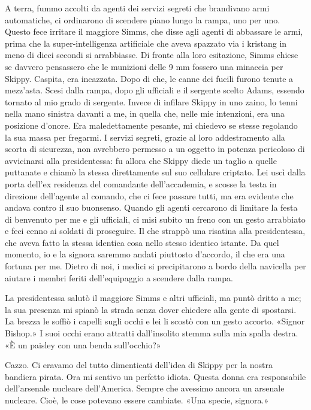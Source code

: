 A terra, fummo accolti da agenti dei servizi segreti che brandivano armi
automatiche, ci ordinarono di scendere piano lungo la rampa, uno per
uno. Questo fece irritare il maggiore Simms, che disse agli agenti di
abbassare le armi, prima che la super-intelligenza artificiale che aveva
spazzato via i kristang in meno di dieci secondi si arrabbiasse. Di
fronte alla loro esitazione, Simms chiese se davvero pensassero che le
munizioni delle 9 mm fossero una minaccia per Skippy. Caspita, era
incazzata. Dopo di che, le canne dei fucili furono tenute a mezz'asta.
Scesi dalla rampa, dopo gli ufficiali e il sergente scelto Adams,
essendo tornato al mio grado di sergente. Invece di infilare Skippy in
uno zaino, lo tenni nella mano sinistra davanti a me, in quella che,
nelle mie intenzioni, era una posizione d'onore. Era maledettamente
pesante, mi chiedevo se stesse regolando la sua massa per fregarmi. I
servizi segreti, grazie al loro addestramento alla scorta di sicurezza,
non avrebbero permesso a un oggetto in potenza pericoloso di avvicinarsi
alla presidentessa: fu allora che Skippy diede un taglio a quelle
puttanate e chiamò la stessa direttamente sul suo cellulare criptato.
Lei uscì dalla porta dell'ex residenza del comandante dell'accademia, e
scosse la testa in direzione dell'agente al comando, che ci fece passare
tutti, ma era evidente che andava contro il suo buonsenso. Quando gli
agenti cercarono di limitare la festa di benvenuto per me e gli
ufficiali, ci misi subito un freno con un gesto arrabbiato e feci cenno
ai soldati di proseguire. Il che strappò una risatina alla
presidentessa, che aveva fatto la stessa identica cosa nello stesso
identico istante. Da quel momento, io e la signora saremmo andati
piuttosto d'accordo, il che era una fortuna per me. Dietro di noi, i
medici si precipitarono a bordo della navicella per aiutare i membri
feriti dell'equipaggio a scendere dalla rampa.

La presidentessa salutò il maggiore Simms e altri ufficiali, ma puntò
dritto a me; la sua presenza mi spianò la strada senza dover chiedere
alla gente di spostarsi. La brezza le soffiò i capelli sugli occhi e lei
li scostò con un gesto accorto. «Signor Bishop.» I suoi occhi erano
attratti dall'insolito stemma sulla mia spalla destra. «È un paisley con
una benda sull'occhio?»

Cazzo. Ci eravamo del tutto dimenticati dell'idea di Skippy per la
nostra bandiera pirata. Ora mi sentivo un perfetto idiota. Questa donna
era responsabile dell'arsenale nucleare dell'America. Sempre che
avessimo ancora un arsenale nucleare. Cioè, le cose potevano essere
cambiate. «Una specie, signora.»

